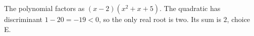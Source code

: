 The polynomial factors as $(x-2)(x^2+x+5)$. The quadratic has discriminant $1-20=-19<0$, so the only real root is two. Its sum is $\boxed{2}$, choice E.
